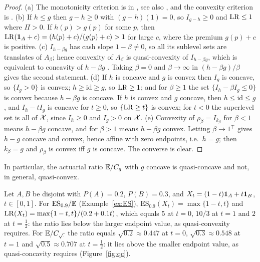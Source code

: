 \begin{proof}
(a) The monotonicity criterion is in \citet{www2020}, see also \citet[Prop.~2]{www2020b}, and the
convexity criterion is \citet[Thm.~3]{www2020}.
(b) If $h\le g$ then $g-h\ge0$ with $(g-h)(1)=0$, so $I_{g-h}\ge0$ and $\mathrm{LR}\le1$ where $\Pi>0$. If $h(p)>g(p)$ for some $p$,
then $\mathrm{LR}(\mathbf 1_A+c)=(h(p)+c)/(g(p)+c)>1$ for large $c$, where the premium $g(p)+c$ is positive.
(c) $I_{h-\beta g}$ has cash slope $1-\beta\ne0$, so all its sublevel sets are translates of $A_\beta$; hence
convexity of $A_\beta$ is quasi-convexity of $I_{h-\beta g}$, which is equivalent to concavity of $h-\beta g$
\citep[Thm.~3]{www2020}. Taking $\beta=0$ and $\beta\to\infty$ in $(h-\beta g)/\beta$ gives the second statement.
(d) If $h$ is concave and $g$ is convex then $I_g$ is concave, so $\{I_g>0\}$ is convex; $h\ge\mathrm{id}\ge g$, so
$\mathrm{LR}\ge1$; and for $\beta\ge1$ the set $\{I_h-\beta I_g\le0\}$ is convex because $h-\beta g$ is concave. If
$h$ is convex and $g$ concave, then $h\le\mathrm{id}\le g$, and $I_h-tI_g$ is concave for $t\ge0$, so
$\{\mathrm{LR}\ge t\}$ is convex; for $t<0$ the superlevel set is all of $\mathcal X$, since $I_h\ge0$ and $I_g>0$ on $\mathcal X$.
(e) Convexity of $\rho_\beta=I_{k_\beta}$ for $\beta<1$ means $h-\beta g$ concave, and for $\beta>1$ means
$h-\beta g$ convex. Letting $\beta\to1^\mp$ gives $h-g$ concave and convex, hence affine with zero endpoints, i.e.\
$h=g$; then $k_\beta=g$ and $\rho_\beta$ is convex iff $g$ is concave. The converse is clear. \qedhere
\end{proof}

In particular, the actuarial ratio $\mathbb E/C_g$ with $g$ concave is quasi-concave and not, in general, quasi-convex.

\begin{example}\label{ex:qc}
Let $A,B$ be disjoint with $P(A)=0.2$, $P(B)=0.3$, and $X_t=(1-t)\mathbf 1_A+t\mathbf 1_B$, $t\in[0,1]$. For
$\mathrm{ES}_{0.9}/\mathbb E$ (Example~\ref{ex:ES}), $\mathrm{ES}_{0.9}(X_t)=\max\{1-t,t\}$ and
$\mathrm{LR}(X_t)=\max\{1-t,t\}/(0.2+0.1t)$, which equals $5$ at $t=0$, $10/3$ at $t=1$ and $2$ at $t=\tfrac12$: the ratio
lies below the larger endpoint value, as quasi-convexity requires. For $\mathbb E/C_{\sqrt{\cdot}}$ the ratio equals
$\sqrt{0.2}\approx0.447$ at $t=0$, $\sqrt{0.3}\approx0.548$ at $t=1$ and $\sqrt{0.5}\approx0.707$ at $t=\tfrac12$: it lies
above the smaller endpoint value, as quasi-concavity requires (Figure~\ref{fig:qc}).
\end{example}

